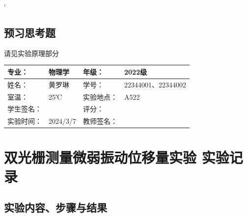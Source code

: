 \documentclass[dvipsnames, svgnames,a4paper,11pt]{article}
\begin{document}
	`
	
	\subsection{预习思考题}
	请见实验原理部分

	
	
	
	
	\clearpage
	
	\begin{table}
		\renewcommand\arraystretch{1.7}
		\centering
		\begin{tabularx}{\textwidth}{|X|X|X|X|}
			\hline
			专业： & 物理学 & 年级： & 2022级 \\
			\hline
			姓名： & 黄罗琳 & 学号： & 22344001、22344002\\
			\hline
			室温： &  25℃& 实验地点： & A522 \\
			\hline
			学生签名：&  & 评分： &\\
			\hline
			实验时间：& 2024/3/7 & 教师签名：&\\
			\hline
		\end{tabularx}
	\end{table}
	
	\section{双光栅测量微弱振动位移量实验 \quad\heiti 实验记录}
	
	\subsection{实验内容、步骤与结果}
	
\end{document}

